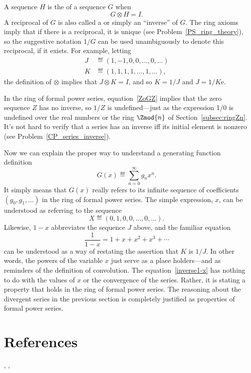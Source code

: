 A sequence $H$ is the  of a sequence $G$ when
\[
G \otimes H = I.
\]
A reciprocal of $G$ is also called a  or
simply an ``inverse'' of $G$.  The ring axioms imply that if there is
a reciprocal, it is unique (see Problem~\ref{PS_ring_theory}), so the
suggestive notation $1/G$ can be used unambiguously to denote this
reciprocal, if it exists.  For example, letting
\begin{align*}
J & \eqdef (1,-1,0,0,\dots,0,\dots)\\
K & \eqdef (1,1,1,1,\dots,1,\dots),
\end{align*}
the definition of $\otimes$ implies that $J \otimes K = I$, and so
$K = 1/J$ and $J = 1/K$e.

In the ring of formal power series, equation~\eqref{ZoGZ} implies that
the zero sequence $Z$ has no inverse, so $1/Z$ is undefined---just as
the expression 1/0 is undefined over the real numbers or the ring
$\Zmod{n}$ of Section~\ref{subsec:ringZn}.  It's not hard to verify
that a series has an inverse iff its initial element is nonzero (see
Problem~\ref{CP_series_inverse}).

Now we can explain the proper way to understand a generating function
definition
\[
G(x) \eqdef \sum_{n=0}^\infty g_n x^n.
\]
It simply means that $G(x)$ really refers to its infinite sequence of
coefficients $(g_0,g_1,\dots)$ in the ring of formal power series.  The
simple expression, $x$, can be understood as referring to the sequence
\[
X \eqdef (0,1,0,0,\dots,0,\dots).
\]
Likewise, $1-x$ abbreviates the sequence $J$ above, and the familiar
equation
\begin{equation}\label{inverse1-x}
\frac{1}{1-x} = 1 + x + x^2 + x^3 + \cdots
\end{equation}
can be understood as a way of restating the assertion that $K$ is
$1/J$.  In other words, the powers of the variable $x$ just serve as a
place holders---and as reminders of the definition of convolution.
The equation~\eqref{inverse1-x} has nothing to do with the values of
$x$ or the convergence of the series.  Rather, it is stating a
property that holds in the ring of formal power series.  The reasoning
about the divergent series in the previous section is completely
justified as properties of formal power series.

\begin{problems}
\practiceproblems
{}

\classproblems
{}
\end{problems}

\section{References}
\cite{Wilf1990},
\cite{GrahamKP1994},
\cite{Bona2007}
\cite{Flajolet2009}

\endinput
